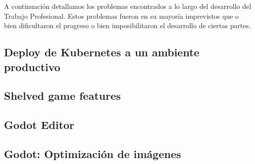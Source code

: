 
\noindent A continuación detallamos los problemas encontrados a lo largo del desarrollo del
Trabajo Profesional. Estos problemas fueron en su mayoría imprevistos que o bien
dificultaron el progreso o bien imposibilitaron el desarrollo de ciertas partes.

\subsection{Deploy de Kubernetes a un ambiente productivo}

\subsection{Shelved game features}

\subsection{Godot Editor}

\subsection{Godot: Optimización de imágenes}

